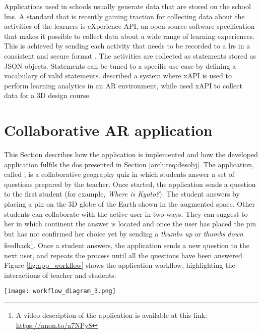Applications used in schools usually generate data that are stored on the school \gls{lms}.
A standard that is recently gaining traction for collecting data about the activities of the learners is eXperience API, an open-source software specification that makes it possible to collect data about a wide range of learning experiences. This is achieved by sending each activity that needs to be recorded to a \gls{lrs} in a consistent and secure format \citep{xAPIspec}.
The activities are collected as statements stored as JSON objects.
Statements can be tuned to a specific use case by defining a vocabulary of valid statements.
\cite{9225931} described a system where xAPI is used to perform learning analytics in an AR environment, while \cite{wu2020design} used xAPI to collect data for a 3D design course.

\section{Collaborative AR application}\label{eval:appdesc}

This Section describes how the application is implemented and how the developed application fulfils the \gls{do}s presented in Section \ref{arch:req:desobj}.
The application, called \appname{}, is a collaborative geography quiz in which students answer a set of questions prepared by the teacher.
Once started, the application sends a question to the first student (for example, \textit{Where is Kyoto?}). The student answers by placing a pin on the 3D globe of the Earth shown in the augmented space.
Other students can collaborate with the active user in two ways. They can suggest to her in which continent the answer is located and \textendash{} once the user has placed the pin but has not confirmed her choice yet \textendash{} by sending a \textit{thumbs up} or \textit{thumbs down} feedback\footnote{A video description of the application is available at this link: \url{https://anon.to/a7NPy8}}.
Once a student answers, the application sends a new question to the next user, and repeats the process until all the questions have been answered.
Figure \ref{fig:app_workflow} shows the application workflow, highlighting the interactions of teacher and students.

\begin{figure*}[htbp]
    \centering
    \texttt{[image: workflow\_diagram\_3.png]}
    \caption{\fontsize{10pt}{11pt}}
    \label{fig:app_workflow}
\end{figure*}

